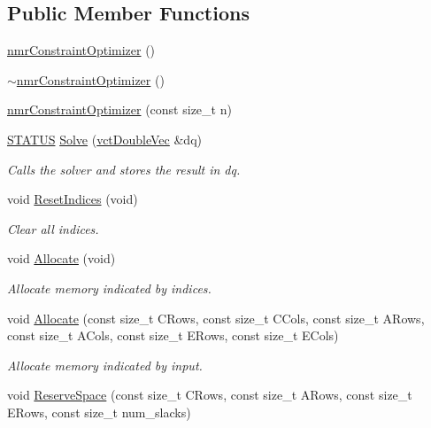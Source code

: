 \subsection*{Public Member Functions}
\begin{DoxyCompactItemize}
\item 
\hyperlink{classnmr_constraint_optimizer_af5dc94f25c1494f00b0b6fe5b011fa02}{nmr\-Constraint\-Optimizer} ()
\item 
\hyperlink{classnmr_constraint_optimizer_a2079234b022af96b6fac7034e7c1bec4}{$\sim$nmr\-Constraint\-Optimizer} ()
\item 
\hyperlink{classnmr_constraint_optimizer_a3417e04498146f162b976ea90fe22df3}{nmr\-Constraint\-Optimizer} (const size\-\_\-t n)
\item 
\hyperlink{classnmr_constraint_optimizer_ad46bf972892431d2c0a43a7099aec898}{S\-T\-A\-T\-U\-S} \hyperlink{classnmr_constraint_optimizer_ac049aa73698d8f5a785453ef3f254c16}{Solve} (\hyperlink{vct_dynamic_vector_types_8h_ade4b3068c86fb88f41af2e5187e491c2}{vct\-Double\-Vec} \&dq)
\begin{DoxyCompactList}\small\item\em Calls the solver and stores the result in dq. \end{DoxyCompactList}\item 
void \hyperlink{classnmr_constraint_optimizer_a5f4186e11727a61726d8164bcb778296}{Reset\-Indices} (void)
\begin{DoxyCompactList}\small\item\em Clear all indices. \end{DoxyCompactList}\item 
void \hyperlink{classnmr_constraint_optimizer_a4f8f9ad056b766e057d9acb8a92aea62}{Allocate} (void)
\begin{DoxyCompactList}\small\item\em Allocate memory indicated by indices. \end{DoxyCompactList}\item 
void \hyperlink{classnmr_constraint_optimizer_a6d76d6d3f15dec7f7ce692b4d53e9b2e}{Allocate} (const size\-\_\-t C\-Rows, const size\-\_\-t C\-Cols, const size\-\_\-t A\-Rows, const size\-\_\-t A\-Cols, const size\-\_\-t E\-Rows, const size\-\_\-t E\-Cols)
\begin{DoxyCompactList}\small\item\em Allocate memory indicated by input. \end{DoxyCompactList}\item 
void \hyperlink{classnmr_constraint_optimizer_a4cfcedd85cb25a577d0793c0f5ff9b2d}{Reserve\-Space} (const size\-\_\-t C\-Rows, const size\-\_\-t A\-Rows, const size\-\_\-t E\-Rows, const size\-\_\-t num\-\_\-slacks)

\end{DoxyCompactItemize}
